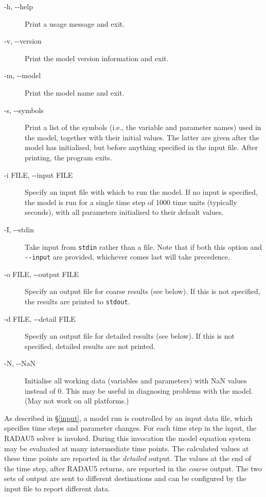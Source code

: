 \documentclass[a4paper,11pt]{article}
\begin{document}
\begin{adjustwidth}{0.8cm}{0.8cm}
\begin{description}
\item[-h, -{}-help] Print a usage message and exit.
\item[-v, -{}-version] Print the model version information and exit.
\item[-m, -{}-model] Print the model name and exit.
\item[-s, -{}-symbols] Print a list of the symbols (i.e., the variable and parameter names) used in the model, together with their initial values. The latter are given after the model has initialised, but before anything specified in the input file. After printing, the program exits.
\item[-i FILE, -{}-input FILE] Specify an input file with which to run the model. If no input is specified, the model is run for a single time step of 1000 time units (typically seconds), with all parameters initialised to their default values.
\item[-I, -{}-stdin] Take input from \texttt{stdin} rather than a file. Note that if both this option and \texttt{-{}-input} are provided, whichever comes last will take precedence.
\item[-o FILE, -{}-output FILE] Specify an output file for coarse results (see below). If this is not specified, the results are printed to \texttt{stdout}.
\item[-d FILE, -{}-detail FILE] Specify an output file for detailed results (see below). If this is not specified, detailed results are not printed.
\item[-N, -{}-NaN] Initialise all working data (variables and parameters) with NaN values instead of 0. This may be useful in diagnosing problems with the model. (May not work on all platforms.)
\end{description}
\end{adjustwidth}

As described in \S\ref{input}, a model run is controlled by an input data file, which specifies time steps and parameter changes. For each time step in the input, the RADAU5 solver is invoked. During this invocation the model equation system may be evaluated at many intermediate time points. The calculated values at these time points are reported in the \textit{detailed} output. The values at the end of the time step, after RADAU5 returns, are reported in the \textit{coarse} output. The two sets of output are sent to different destinations and can be configured by the input file to report different data.
\end{document}
